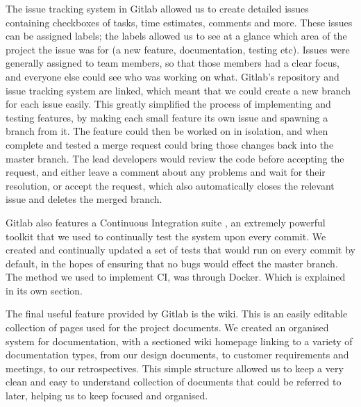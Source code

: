 \documentclass{l3proj}
\begin{document}
The issue tracking system in Gitlab allowed us to create detailed issues containing checkboxes of tasks, time estimates, comments and more. These issues can be assigned labels; the labels allowed us to see at a glance which area of the project the issue was for (a new feature, documentation, testing etc). Issues were generally assigned to team members, so that those members had a clear focus, and everyone else could see who was working on what. Gitlab's repository and issue tracking system are linked, which meant that we could create a new branch for each issue easily. This greatly simplified the process of implementing and testing features, by making each small feature its own issue and spawning a branch from it. The feature could then be worked on in isolation, and when complete and tested a merge request could bring those changes back into the master branch. The lead developers would review the code before accepting the request, and either leave a comment about any problems and wait for their resolution, or accept the request, which also automatically closes the relevant issue and deletes the merged branch.

Gitlab also features a Continuous Integration suite \cite{ci}, an extremely powerful toolkit that we used to continually test the system upon every commit. We created and continually updated a set of tests that would run on every commit by default, in the hopes of ensuring that no bugs would effect the master branch. The method we used to implement CI, was through Docker. Which is explained in its own section.

The final useful feature provided by Gitlab is the wiki. This is an easily editable collection of pages used for the project documents. We created an organised system for documentation, with a sectioned wiki homepage linking to a variety of documentation types, from our design documents, to customer requirements and meetings, to our retrospectives. This simple structure allowed us to keep a very clean and easy to understand collection of documents that could be referred to later, helping us to keep focused and organised.
\end{document}
